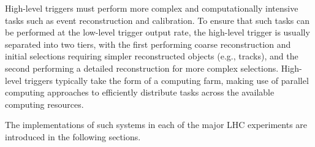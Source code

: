 High-level triggers must perform more complex and computationally intensive tasks such as event reconstruction and calibration. To ensure that such tasks can be performed at the low-level trigger output rate, the high-level trigger is usually separated into two tiers, with the first performing coarse reconstruction and initial selections requiring simpler reconstructed objects (e.g., tracks), and the second performing a detailed reconstruction for more complex selections. High-level triggers typically take the form of a computing farm, making use of parallel computing approaches to efficiently distribute tasks across the available computing resources.

The implementations of such systems in each of the major LHC experiments are introduced in the following sections.





